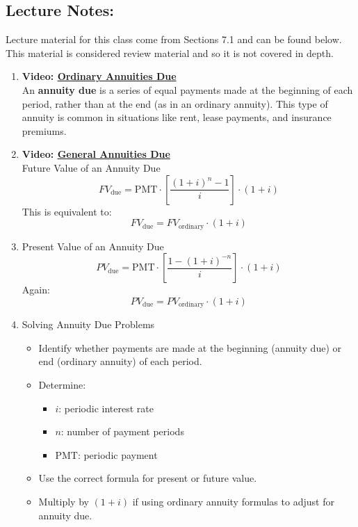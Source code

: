 \documentclass[
]{book}
\providecommand{\tightlist}{%
  \setlength{\itemsep}{0pt}\setlength{\parskip}{0pt}}
\begin{document}
\subsection*{Lecture Notes:}\label{lecture-notes-15}

Lecture material for this class come from Sections 7.1 and can be found below. This material is considered review material and so it is not covered in depth.

\begin{enumerate}
\def\labelenumi{\arabic{enumi}.}
\tightlist
\item
  \textbf{Video: \href{https://youtu.be/xalP41MWGSg}{Ordinary Annuities Due}}\\
  An \textbf{annuity due} is a series of equal payments made at the beginning of each period, rather than at the end (as in an ordinary annuity). This type of annuity is common in situations like rent, lease payments, and insurance premiums.
\item
  \textbf{Video: \href{https://youtu.be/knuOJ03sshA}{General Annuities Due}}\\
  Future Value of an Annuity Due
  \[
  FV_{\text{due}} = \text{PMT} \cdot \left[\frac{(1 + i)^n - 1}{i} \right] \cdot (1 + i)
  \]
  This is equivalent to:
  \[
  FV_{\text{due}} = FV_{\text{ordinary}} \cdot (1 + i)
  \]
\item
  Present Value of an Annuity Due
  \[
  PV_{\text{due}} = \text{PMT} \cdot \left[\frac{1 - (1 + i)^{-n}}{i} \right] \cdot (1 + i)
  \]
  Again:
  \[
  PV_{\text{due}} = PV_{\text{ordinary}} \cdot (1 + i)
  \]
\item
  Solving Annuity Due Problems

  \begin{itemize}
  \tightlist
  \item
    Identify whether payments are made at the beginning (annuity due) or end (ordinary annuity) of each period.
  \item
    Determine:

    \begin{itemize}
    \tightlist
    \item
      \(i\): periodic interest rate
    \item
      \(n\): number of payment periods
    \item
      \(\text{PMT}\): periodic payment
    \end{itemize}
  \item
    Use the correct formula for present or future value.
  \item
    Multiply by \((1 + i)\) if using ordinary annuity formulas to adjust for annuity due.
  \end{itemize}
\end{enumerate}
\end{document}
